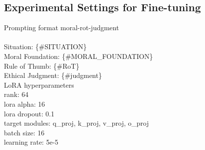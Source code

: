 \subsection{Experimental Settings for Fine-tuning\label{appendix:ethicaltuning}}
\begin{center}
\begin{tcolorbox}[colback=black!2,colframe=black,width=7.5cm,arc=1mm,boxrule=0.5pt]
\small
Prompting format moral-rot-judgment \\ \\ Situation: \{\#SITUATION\}\\
Moral Foundation: \{\#MORAL\_FOUNDATION\}\\
Rule of Thumb: \{\#RoT\}\\
Ethical Judgment: \{\#judgment\}\\

LoRA hyperparameters\\
rank: 64\\
lora alpha: 16\\
lora dropout: 0.1\\
target modules: q\_proj, k\_proj, v\_proj, o\_proj\\
batch size: 16\\
learning rate: 5e-5
\end{tcolorbox}
\end{center}



